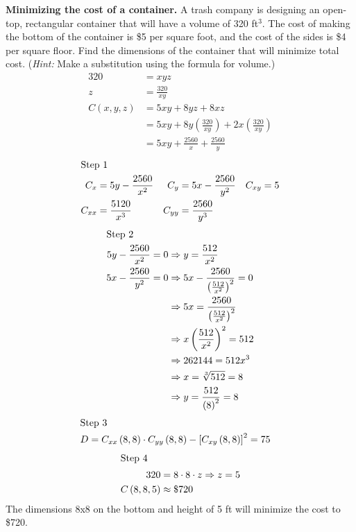 \documentclass[12pt]{article}
\newenvironment{problem}[2][]{
    \begin{trivlist}
        \item[
            {\bfseries #1}
            {\bfseries #2.}
        ]
}{\end{trivlist}}
\begin{document}
\bigskip

\begin{problem}{19}
    \textbf{Minimizing the cost of a container.}
    A trash company is designing an open-top, rectangular container that will have a volume of 320 ft$^3$.
    The cost of making the bottom of the container is \$5 per square foot, and the cost of the sides is \$4 per square floor.
    Find the dimensions of the container that will minimize total cost.
    (\textit{Hint:} Make a substitution using the formula for volume.)
    \begin{align}
        320 &= xyz \\
        z &= \frac{320}{xy} \\
        C(x,y,z) &= 5xy + 8yz + 8xz \\
        &= 5xy + 8y \left(\frac{320}{xy}\right) + 2x \left(\frac{320}{xy}\right) \\
        &= 5xy + \frac{2560}{x} + \frac{2560}{y}
    \end{align}
    \begin{align*}
        \shortintertext{Step 1}
        C_x &= 5y - \frac{2560}{x^2} & C_y &= 5x - \frac{2560}{y^2} & C_{xy} &= 5 \\
        C_{xx} &= \frac{5120}{x^3} & C_{yy} &= \frac{2560}{y^3}
    \end{align*}
    \begin{align}
        \shortintertext{Step 2}
        5y - \frac{2560}{x^2} &= 0 \Rightarrow y = \frac{512}{x^2} \\
        5x - \frac{2560}{y^2} &= 0 \Rightarrow 5x - \frac{2560}{\left(\frac{512}{x^2}\right)^2} = 0 \\
        &\phantom{=. 0} \Rightarrow 5x = \frac{2560}{\left(\frac{512}{x^2}\right)^2} \\
        &\phantom{=. 0} \Rightarrow x \left(\frac{512}{x^2}\right)^2 = 512 \\
        &\phantom{=. 0} \Rightarrow 262144 = 512x^3 \\
        &\phantom{=. 0} \Rightarrow x = \sqrt[3]{512} = 8 \\
        &\phantom{=. 0} \Rightarrow y = \frac{512}{\left(8\right)^2} = 8
    \end{align}
    \begin{align}
        \shortintertext{Step 3}
        D &= C_{xx} \left(8, 8\right) \cdot C_{yy} \left(8, 8\right) - \left[C_{xy} \left(8, 8\right)\right]^2 = 75
    \end{align}
    \begin{align}
        \shortintertext{Step 4}
        320 &= 8 \cdot 8 \cdot z \Rightarrow z = 5 \\
        C\left(8, 8, 5\right) &\approx \$720
    \end{align}
        The dimensions 8x8 on the bottom and height of 5 ft will minimize the cost to \$720.
\end{problem}
\end{document}
